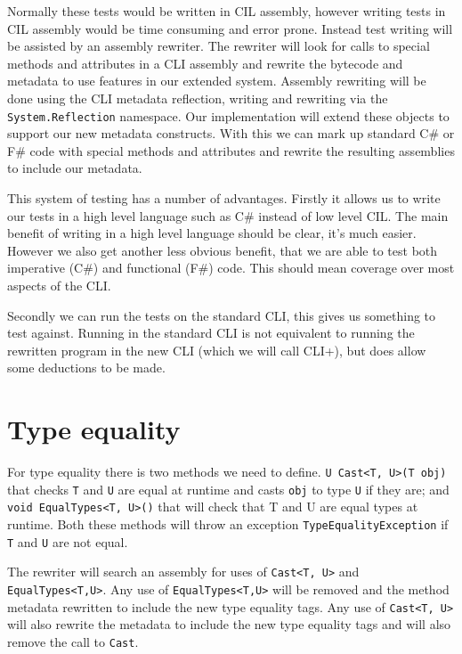 \documentclass[english]{report}
\begin{document}
Normally these tests would be written in CIL assembly, however writing tests in
CIL assembly would be time consuming and error prone. Instead test writing will
be assisted by an assembly rewriter. The rewriter will look for calls to
special methods and attributes in a CLI assembly and rewrite the bytecode and
metadata to use features in our extended system.  Assembly rewriting will be
done using the CLI metadata reflection, writing and rewriting via the
\texttt{System.Reflection} namespace.  Our implementation will extend these
objects to support our new metadata constructs. With this we can mark up
standard C\# or F\# code with special methods and attributes and rewrite the
resulting assemblies to include our metadata.

This system of testing has a number of advantages. Firstly it allows us to
write our tests in a high level language such as C\# instead of low level CIL.
The main benefit of writing in a high level language should be clear, it's much
easier. However we also get another less obvious benefit, that we are able to
test both imperative (C\#) and functional (F\#) code. This should mean coverage
over most aspects of the CLI.

Secondly we can run the tests on the standard CLI, this gives us something to
test against. Running in the standard CLI is not equivalent to running the
rewritten program in the new CLI (which we will call CLI+), but does allow some
deductions to be made.

\section{Type equality}

For type equality there is two methods we need to define. \texttt{U Cast<T,
U>(T obj)} that checks \texttt{T} and \texttt{U} are equal at runtime and casts
\texttt{obj} to type \texttt{U} if they are; and \texttt{void EqualTypes<T,
U>()} that will check that T and U are equal types at runtime. Both these
methods will throw an exception \texttt{TypeEqualityException} if \texttt{T}
and \texttt{U} are not equal.

The rewriter will search an assembly for uses of \texttt{Cast<T, U>} and
\texttt{EqualTypes<T,U>}. Any use of \texttt{EqualTypes<T,U>} will be removed
and the method metadata rewritten to include the new type equality tags. Any
use of \texttt{Cast<T, U>} will also rewrite the metadata to include the new
type equality tags and will also remove the call to \texttt{Cast}.
\end{document}
